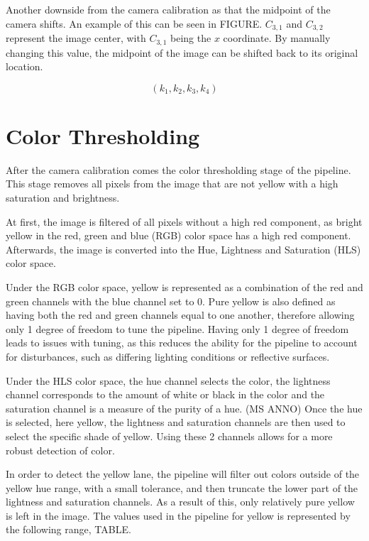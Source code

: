 \documentclass[arbeit=studie,oneside,BCOR=12mm]{ArbeitRST}
\begin{document}
Another downside from the camera calibration as that the midpoint of the camera
shifts. An example of this can be seen in FIGURE. $C_{3,1}$ and $C_{3,2}$ 
represent the image center, with $C_{3,1}$ being the $x$ coordinate. By manually
changing this value, the midpoint of the image can be shifted back to its 
original location.

\begin{equation}
  (k_1, k_2, k_3, k_4)
\end{equation}

\section{Color Thresholding}

After the camera calibration comes the color thresholding stage of the pipeline.
This stage removes all pixels from the image that are not yellow with a high
saturation and brightness. 

At first, the image is filtered of all pixels without a high red component, as
bright yellow in the red, green and blue (RGB) color space has a high red
component. Afterwards, the image is converted into the Hue, Lightness and
Saturation (HLS) color space. 

Under the RGB color space, yellow is represented as a combination of the red 
and green channels with the blue channel set to 0. Pure yellow is also defined 
as having both the red and green channels equal to one another, therefore 
allowing only 1 degree of freedom to tune the pipeline.  Having only 1 degree 
of freedom leads to issues with tuning, as this reduces the ability for the 
pipeline to account for disturbances, such as differing lighting conditions or 
reflective surfaces.

Under the HLS color space, the hue channel selects the color, the lightness 
channel corresponds to the amount of white or black in the color and the 
saturation channel is a measure of the purity of a hue. (MS ANNO) Once the hue 
is selected, here yellow, the lightness and saturation channels are then used 
to select the specific shade of yellow. Using these 2 channels allows for a 
more robust detection of color.

In order to detect the yellow lane, the pipeline will filter out colors outside 
of the yellow hue range, with a small tolerance, and then truncate the lower 
part of the lightness and saturation channels. As a result of this, only 
relatively pure yellow is left in the image.
The values used in the pipeline for yellow is represented by the following 
range,
TABLE.
\end{document}
